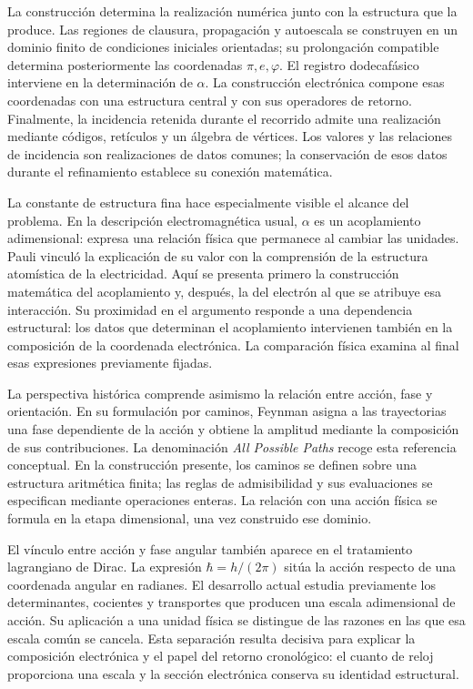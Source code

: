 La construcción determina la realización numérica junto con la estructura
que la produce. Las regiones de clausura, propagación y
autoescala se construyen en un dominio finito de condiciones iniciales
orientadas; su prolongación compatible determina posteriormente las coordenadas
\(\pi,e,\varphi\). El registro dodecafásico interviene en la determinación de
\(\alpha\). La construcción electrónica compone esas coordenadas con una
estructura central y con sus operadores de retorno. Finalmente, la incidencia
retenida durante el recorrido admite una realización mediante códigos,
retículos y un álgebra de vértices. Los valores y las relaciones de
incidencia son realizaciones de datos comunes; la conservación de esos
datos durante el refinamiento establece su conexión matemática.





La constante de estructura fina hace especialmente visible el alcance del
problema. En la descripción electromagnética usual, \(\alpha\) es un
acoplamiento adimensional: expresa una relación física que permanece al
cambiar las unidades. Pauli vinculó la explicación de su valor con la
comprensión de la estructura atomística de la electricidad\cite{pauli1946}.
Aquí se presenta primero la construcción matemática del acoplamiento y,
después, la del electrón al que se atribuye esa interacción. Su proximidad
en el argumento responde a una dependencia estructural: los datos que
determinan el acoplamiento intervienen también en la composición de la
coordenada electrónica. La comparación física examina al final esas
expresiones previamente fijadas.

La perspectiva histórica comprende asimismo la relación entre acción, fase
y orientación. En su formulación por caminos, Feynman asigna a las
trayectorias una fase dependiente de la acción y obtiene la amplitud mediante
la composición de sus contribuciones\cite{feynman1948}. La denominación
\emph{All Possible Paths} recoge esta referencia conceptual. En la construcción
presente, los caminos se definen sobre una estructura aritmética finita;
las reglas de admisibilidad y sus evaluaciones se especifican mediante
operaciones enteras. La relación con una acción física se formula en la
etapa dimensional, una vez construido ese dominio.

El vínculo entre acción y fase angular también aparece en el tratamiento
lagrangiano de Dirac\cite{dirac1933}. La expresión \(\hbar=h/(2\pi)\)
sitúa la acción respecto de una coordenada angular en radianes. El desarrollo
actual estudia previamente los determinantes, cocientes y transportes que
producen una escala adimensional de acción. Su aplicación a una unidad
física se distingue de las razones en las que esa escala común se cancela.
Esta separación resulta decisiva para explicar la composición electrónica
y el papel del retorno cronológico: el cuanto de reloj proporciona una
escala y la sección electrónica conserva su identidad estructural.

